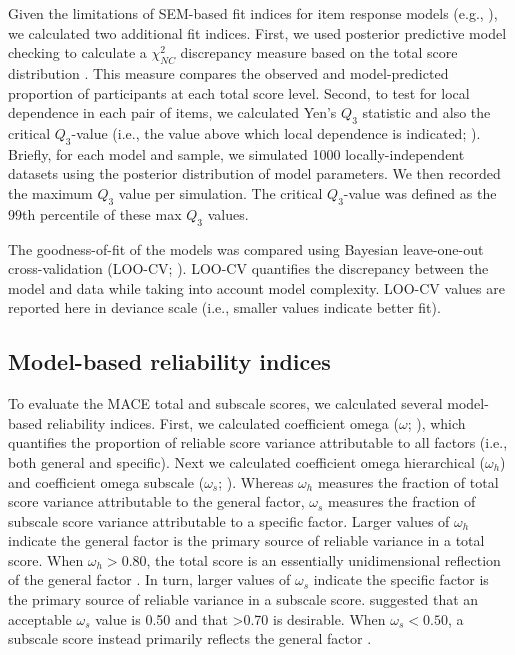 \documentclass[letterpaper,man,natbib,longtable,floatsintext,12pt]{apa6}
\begin{document}
Given the limitations of SEM-based fit indices for item response models (e.g., \citealt{clark2018model}), we calculated two additional fit indices. First, we used posterior predictive model checking to calculate a $\chi^2_{NC}$ discrepancy measure based on the total score distribution \citep{sinharay2006posterior}. This measure compares the observed and model-predicted proportion of participants at each total score level. Second, to test for local dependence in each pair of items, we calculated Yen's $Q_3$ statistic \citep{yen1984effects} and also the critical $Q_3$-value (i.e., the value above which local dependence is indicated; \citealt{christensen2017critical}). Briefly, for each model and sample, we simulated 1000 locally-independent datasets using the posterior distribution of model parameters. We then recorded the maximum $Q_3$ value per simulation. The critical $Q_3$-value was defined as the 99th percentile of these max $Q_3$ values. 

The goodness-of-fit of the models was compared using Bayesian leave-one-out cross-validation (LOO-CV; \citealt{vehtari2017practical}). LOO-CV quantifies the discrepancy between the model and data while taking into account model complexity. LOO-CV values are reported here in deviance scale (i.e., smaller values indicate better fit).

\subsection{Model-based reliability indices}

To evaluate the MACE total and subscale scores, we calculated several model-based reliability indices. First, we calculated coefficient omega ($\omega$; \citealt{mcdonald2013test}), which quantifies the proportion of reliable score variance attributable to all factors (i.e., both general and specific). Next we calculated coefficient omega hierarchical ($\omega_h$) and coefficient omega subscale ($\omega_s$;  \citealt{reise2013scoring}). Whereas $\omega_h$ measures the fraction of total score variance attributable to the general factor, $\omega_s$ measures the fraction of subscale score variance attributable to a specific factor. Larger values of $\omega_h$ indicate the general factor is the primary source of reliable variance in a total score. When $\omega_h > 0.80$, the total score is an essentially unidimensional reflection of the general factor \citep{rodriguez2016applying}. In turn, larger values of $\omega_s$ indicate the specific factor is the primary source of reliable variance in a subscale score. \cite{canivez2016bifactor} suggested that an acceptable $\omega_s$ value is 0.50 and that >0.70 is desirable. When $\omega_s < 0.50$, a subscale score instead primarily reflects the general factor \citep{gignac2013bifactor}. 
\end{document}

